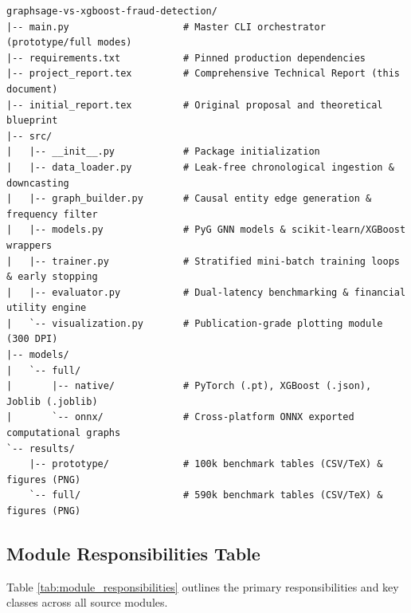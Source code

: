 \documentclass[11pt,a4paper]{report}
\begin{document}
\begin{verbatim}
graphsage-vs-xgboost-fraud-detection/
|-- main.py                    # Master CLI orchestrator (prototype/full modes)
|-- requirements.txt           # Pinned production dependencies
|-- project_report.tex         # Comprehensive Technical Report (this document)
|-- initial_report.tex         # Original proposal and theoretical blueprint
|-- src/
|   |-- __init__.py            # Package initialization
|   |-- data_loader.py         # Leak-free chronological ingestion & downcasting
|   |-- graph_builder.py       # Causal entity edge generation & frequency filter
|   |-- models.py              # PyG GNN models & scikit-learn/XGBoost wrappers
|   |-- trainer.py             # Stratified mini-batch training loops & early stopping
|   |-- evaluator.py           # Dual-latency benchmarking & financial utility engine
|   `-- visualization.py       # Publication-grade plotting module (300 DPI)
|-- models/
|   `-- full/
|       |-- native/            # PyTorch (.pt), XGBoost (.json), Joblib (.joblib)
|       `-- onnx/              # Cross-platform ONNX exported computational graphs
`-- results/
    |-- prototype/             # 100k benchmark tables (CSV/TeX) & figures (PNG)
    `-- full/                  # 590k benchmark tables (CSV/TeX) & figures (PNG)
\end{verbatim}

\subsection{Module Responsibilities Table}
Table \ref{tab:module_responsibilities} outlines the primary responsibilities and key classes across all source modules.
\end{document}
